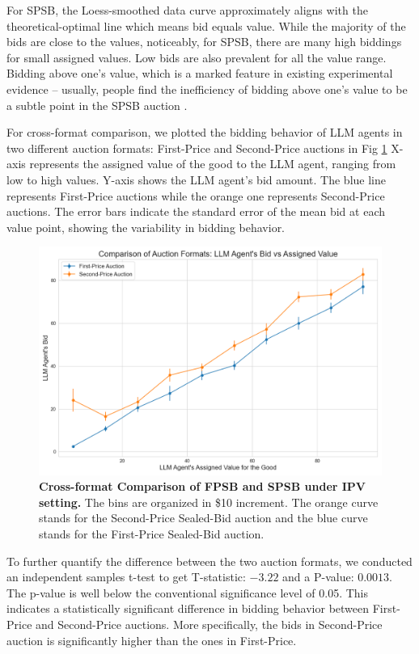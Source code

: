 \documentclass{article} %
\newcommand{\TK}[1]{\textcolor{red}{TK: #1}}
\begin{document}
For SPSB, the Loess-smoothed data curve approximately aligns with the theoretical-optimal line which means bid equals value. While the majority of the bids are close to the values, 
noticeably, for SPSB, there are many high biddings for small assigned values. Low bids are also prevalent for all the value range.
 Bidding above one's value, which is a marked feature in existing experimental evidence -- usually, people find the inefficiency of bidding above one's value to be a subtle point in the SPSB auction \citep{kagel1987information}.

For cross-format comparison, we plotted the bidding behavior of LLM agents in two different auction formats: First-Price and Second-Price auctions in Fig \ref{fig:cross}
X-axis represents the assigned value of the good to the LLM agent, ranging from low to high values.
Y-axis shows the LLM agent's bid amount.
The blue line represents First-Price auctions while the orange one represents Second-Price auctions.
The error bars indicate the standard error of the mean bid at each value point, showing the variability in bidding behavior.
\begin{figure}[h]
    \centering \includegraphics[width=0.7\linewidth]{Figs/cross-format.png}
    \caption{\textbf{Cross-format Comparison of FPSB and SPSB under IPV setting.} The bins are organized in \$10 increment. The orange curve stands for the Second-Price Sealed-Bid auction and the blue curve stands for the First-Price Sealed-Bid auction.}
    \label{fig:cross}
\end{figure}


To further quantify the difference between the two auction formats, we conducted an independent samples t-test to get T-statistic: \(-3.22\) and a P-value: \(0.0013\).
The p-value is well below the conventional significance level of 0.05. 
This indicates a statistically significant difference in bidding behavior between First-Price and Second-Price auctions. 
More specifically, the bids in Second-Price auction is significantly higher than the ones in First-Price.
\end{document}
